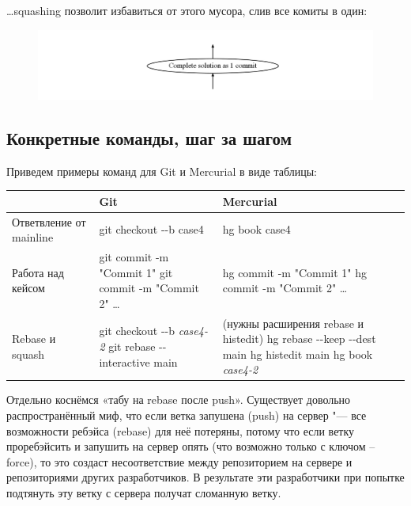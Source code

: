 \documentclass[10pt, a5paper]{article}
\begin{document}
\ldots{}squashing позволит избавиться от этого мусора, слив все комиты в один:
\begin{figure}[h!]
  \centering
  \includegraphics[scale=0.3]{02_2014_history-without-garbage.png}
\end{figure}

\subsection*{Конкретные команды, шаг за шагом}

Приведем примеры команд для Git и Mercurial в виде таблицы:

\begin{table}
  \centering
  \begin{tabular}{P{2.5cm}|P{3.5cm}|P{3.5cm}}
    \hline
                                  ~  & \textbf{Git}                   & \textbf{Mercurial}          \\ \hline
    Ответвление от mainline          & git checkout -{}-b case4       & hg book case4              \\
    Работа над кейсом                & git commit -m "Commit 1" \newline
                                       git commit -m "Commit 2" \ldots{}
                                                                    & hg commit -m "Commit 1" \newline
                                                                      hg commit -m "Commit 2" \ldots{} \\
    Rebase и squash              & git checkout -{}-b \emph{case4-2} \newline
                                   git rebase -{}-interactive main
                                                     & (нужны расширения rebase и histedit) \newline
                                                       hg rebase -{}-keep -{}-dest main \newline
                                                       hg histedit main \newline
                                                       hg book \emph{case4-2}      \\
    \hline
  \end{tabular}
\end{table}
Отдельно коснёмся «табу на rebase после push». Существует довольно распространённый миф, что если ветка запушена (push) на сервер "--- все возможности ребэйса (rebase) для неё потеряны, потому что если ветку проребэйсить и запушить на сервер опять (что возможно только с ключом --force), то это создаст несоответствие между репозиторием на сервере и репозиториями других разработчиков. В результате эти разработчики при попытке подтянуть эту ветку с сервера получат сломанную ветку.
\end{document}

